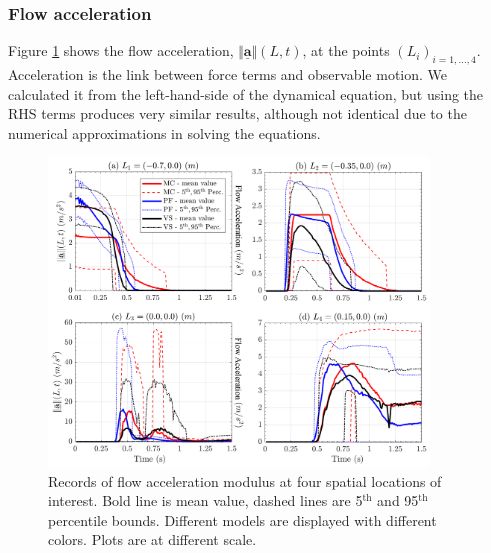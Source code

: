 \documentclass{article}
\begin{document}
\subsubsection{Flow acceleration}
Figure \ref{fig:Ramp-AccL} shows the flow acceleration, $\Vert \underline{\mathbf{a}} \Vert(L,t)$, at the points $(L_i)_{i=1,\dots,4}$. Acceleration is the link between force terms and observable motion. We calculated it from the left-hand-side of the dynamical equation, but using the RHS terms produces very similar results, although not identical due to the numerical approximations in solving the equations.
\begin{figure}[H]
         \centering
        \includegraphics[width=0.9\textwidth]{InclinedPlane/LocalMeasurments/Acceleration.png}
        \caption{Records of flow acceleration modulus at four spatial locations of interest. Bold line is mean value, dashed lines are 5$^{\mathrm{th}}$ and 95$^{\mathrm{th}}$ percentile bounds. Different models are displayed with different colors. Plots are at different scale.}
        \label{fig:Ramp-AccL}
\end{figure}
\end{document}
